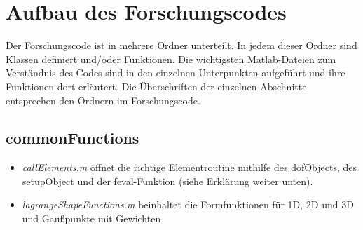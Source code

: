 \documentclass[12pt,bibstyle=none,pagenumberinfooter]{ifmdocument}
\begin{document}
	\section{Aufbau des Forschungscodes}
	Der Forschungscode ist in mehrere Ordner unterteilt. In jedem dieser Ordner sind Klassen definiert und/oder Funktionen. Die wichtigsten Matlab-Dateien zum Verst\"andnis des Codes sind in den einzelnen Unterpunkten aufgef\"uhrt und ihre Funktionen dort erl\"autert. Die \"Uberschriften der einzelnen Abschnitte entsprechen den Ordnern im Forschungscode.
	\subsection{commonFunctions}
		\begin{itemize}
			\item \textit{callElements.m} \"offnet die richtige Elementroutine mithilfe des dofObjects, des setupObject und der feval-Funktion (siehe Erkl\"arung weiter unten).
			\item \textit{lagrangeShapeFunctions.m} beinhaltet die Formfunktionen für 1D, 2D und 3D und Gaußpunkte mit Gewichten
		\end{itemize}
\end{document}
